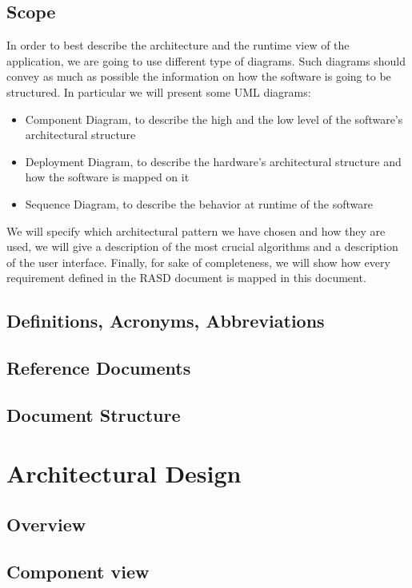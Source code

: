 \documentclass[english]{article}
\begin{document}
	\subsection{Scope}
		In order to best describe the architecture and the runtime view of the application, we are going to use different type of diagrams. Such diagrams should convey as much as possible the information on how the software is going to be structured.
		In particular we will present some UML diagrams:
			\begin{itemize}
				\item{Component Diagram, to describe the high and the low level of the software's architectural structure}
				\item{Deployment Diagram, to describe the hardware's architectural structure and how the software is mapped on it}
				\item{Sequence Diagram, to describe the behavior at runtime of the software}
			\end{itemize}
		 We will specify which architectural pattern we have chosen and how they are used, we will give a description of the most crucial algorithms and a description of the user interface. Finally, for sake of completeness, we will show how every requirement defined in the RASD document is mapped in this document.
	\subsection{Definitions, Acronyms, Abbreviations}
	\subsection{Reference Documents}
	\subsection{Document Structure}
\section{Architectural Design}
	\subsection{Overview}%
	\subsection{Component view}
\end{document}
